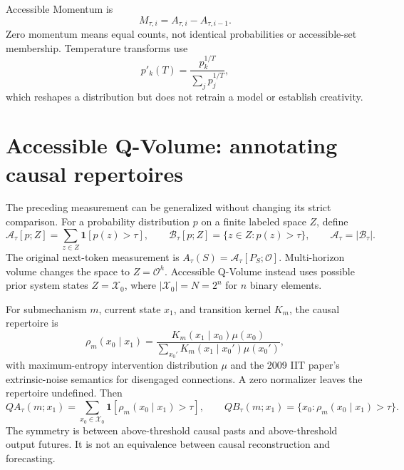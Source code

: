 \documentclass[11pt,a4paper]{article}
\begin{document}
Accessible Momentum is
\begin{equation}
M_{\tau,i}=A_{\tau,i}-A_{\tau,i-1}.
\end{equation}
Zero momentum means equal counts, not identical probabilities or accessible-set membership. Temperature transforms use
\begin{equation}
p'_k(T)=\frac{p_k^{1/T}}{\sum_j p_j^{1/T}},
\end{equation}
which reshapes a distribution but does not retrain a model or establish creativity.

\section{Accessible Q-Volume: annotating causal repertoires}
The preceding measurement can be generalized without changing its strict comparison. For a probability distribution $p$ on a finite labeled space $Z$, define
\begin{equation}
\mathcal A_\tau[p;Z]=\sum_{z\in Z}\mathbf 1[p(z)>\tau],\qquad
\mathcal B_\tau[p;Z]=\{z\in Z:p(z)>\tau\},\qquad \mathcal A_\tau=|\mathcal B_\tau|.
\end{equation}
The original next-token measurement is $A_\tau(S)=\mathcal A_\tau[P_S;\mathcal O]$. Multi-horizon volume changes the space to $Z=\mathcal O^h$. Accessible Q-Volume instead uses possible prior system states $Z=\mathcal X_0$, where $|\mathcal X_0|=N=2^n$ for $n$ binary elements.

For submechanism $m$, current state $x_1$, and transition kernel $K_m$, the causal repertoire is
\begin{equation}
\rho_m(x_0\mid x_1)=\frac{K_m(x_1\mid x_0)\mu(x_0)}{\sum_{x_0'}K_m(x_1\mid x_0')\mu(x_0')},
\end{equation}
with maximum-entropy intervention distribution $\mu$ and the 2009 IIT paper's extrinsic-noise semantics for disengaged connections. A zero normalizer leaves the repertoire undefined. Then
\begin{equation}
QA_\tau(m;x_1)=\sum_{x_0\in\mathcal X_0}\mathbf 1[\rho_m(x_0\mid x_1)>\tau],\qquad
QB_\tau(m;x_1)=\{x_0:\rho_m(x_0\mid x_1)>\tau\}.
\end{equation}
The symmetry is between above-threshold causal pasts and above-threshold output futures. It is not an equivalence between causal reconstruction and forecasting.
\end{document}
